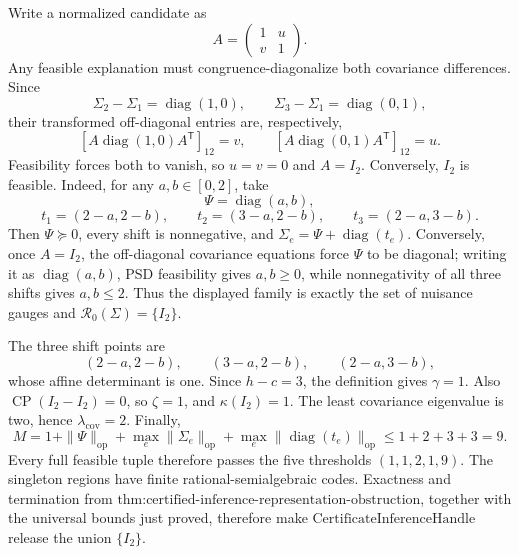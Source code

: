 Write a normalized candidate as
\[
A=\begin{pmatrix}1&u\\v&1\end{pmatrix}.
\]
Any feasible explanation must congruence-diagonalize both covariance differences. Since
\[
\Sigma_2-\Sigma_1=\operatorname{diag}(1,0),
\qquad
\Sigma_3-\Sigma_1=\operatorname{diag}(0,1),
\]
their transformed off-diagonal entries are, respectively,
\[
\left[A\operatorname{diag}(1,0)A^{\mathsf T}\right]_{12}=v,
\qquad
\left[A\operatorname{diag}(0,1)A^{\mathsf T}\right]_{12}=u.
\]
Feasibility forces both to vanish, so \(u=v=0\) and \(A=I_2\). Conversely, \(I_2\) is feasible. Indeed, for any \(a,b\in[0,2]\), take
\[
\Psi=\operatorname{diag}(a,b),
\]
\[
t_1=(2-a,2-b),\qquad
t_2=(3-a,2-b),\qquad
t_3=(2-a,3-b).
\]
Then \(\Psi\succeq0\), every shift is nonnegative, and \(\Sigma_e=\Psi+\operatorname{diag}(t_e)\). Conversely, once \(A=I_2\), the off-diagonal covariance equations force \(\Psi\) to be diagonal; writing it as \(\operatorname{diag}(a,b)\), PSD feasibility gives \(a,b\geq0\), while nonnegativity of all three shifts gives \(a,b\leq2\). Thus the displayed family is exactly the set of nuisance gauges and \(\mathcal R_0(\Sigma)=\{I_2\}\).

The three shift points are
\[
(2-a,2-b),\qquad(3-a,2-b),\qquad(2-a,3-b),
\]
whose affine determinant is one. Since \(h-c=3\), the definition gives \(\gamma=1\). Also \(\operatorname{CP}(I_2-I_2)=0\), so \(\zeta=1\), and \(\kappa(I_2)=1\). The least covariance eigenvalue is two, hence \(\lambda_{\mathrm{cov}}=2\). Finally,
\[
M
=1+\|\Psi\|_{\mathrm{op}}
+\max_e\|\Sigma_e\|_{\mathrm{op}}
+\max_e\|\operatorname{diag}(t_e)\|_{\mathrm{op}}
\leq1+2+3+3=9.
\]
Every full feasible tuple therefore passes the five thresholds \((1,1,2,1,9)\). The singleton regions have finite rational-semialgebraic codes. Exactness and termination from \(\text{thm:certified-inference-representation-obstruction}\), together with the universal bounds just proved, therefore make \(\text{CertificateInferenceHandle}\) release the union \(\{I_2\}\).